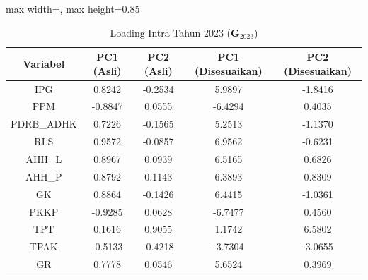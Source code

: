 \begin{table}[H]
\centering
\caption{Loading Intra Tahun 2023 ($\mathbf{G}_{2023}$)} \label{tab:app1loading_intra_2023}
\begin{adjustbox}{max width=\textwidth, max height=0.85\textheight}
\begin{tabular}{|c|c|c|c|c|}
\hline
\textbf{Variabel} & \textbf{PC1 (Asli)} & \textbf{PC2 (Asli)} & \textbf{PC1 (Disesuaikan)} & \textbf{PC2 (Disesuaikan)} \\
\hline
IPG & 0.8242 & -0.2534 & 5.9897 & -1.8416 \\
PPM & -0.8847 & 0.0555 & -6.4294 & 0.4035 \\
PDRB\_ADHK & 0.7226 & -0.1565 & 5.2513 & -1.1370 \\
RLS & 0.9572 & -0.0857 & 6.9562 & -0.6231 \\
AHH\_L & 0.8967 & 0.0939 & 6.5165 & 0.6826 \\
AHH\_P & 0.8792 & 0.1143 & 6.3893 & 0.8309 \\
GK & 0.8864 & -0.1426 & 6.4415 & -1.0361 \\
PKKP & -0.9285 & 0.0628 & -6.7477 & 0.4560 \\
TPT & 0.1616 & 0.9055 & 1.1742 & 6.5802 \\
TPAK & -0.5133 & -0.4218 & -3.7304 & -3.0655 \\
GR & 0.7778 & 0.0546 & 5.6524 & 0.3969 \\
\hline
\end{tabular}
\end{adjustbox}
\end{table}